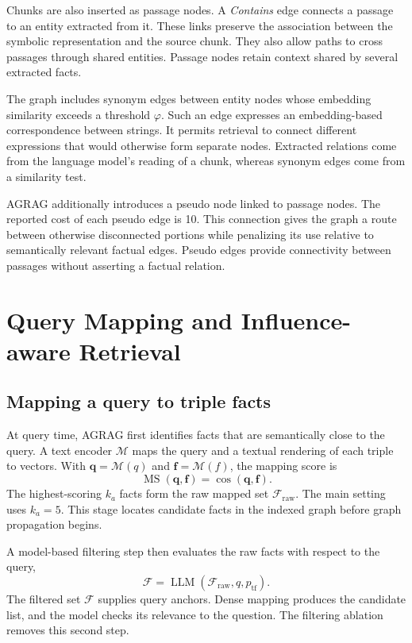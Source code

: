 Chunks are also inserted as passage nodes. A \textit{Contains} edge connects a passage to an entity extracted from it. These links preserve the association between the symbolic representation and the source chunk. They also allow paths to cross passages through shared entities. Passage nodes retain context shared by several extracted facts.

The graph includes synonym edges between entity nodes whose embedding similarity exceeds a threshold $\varphi$. Such an edge expresses an embedding-based correspondence between strings. It permits retrieval to connect different expressions that would otherwise form separate nodes. Extracted relations come from the language model's reading of a chunk, whereas synonym edges come from a similarity test.

AGRAG additionally introduces a pseudo node linked to passage nodes. The reported cost of each pseudo edge is 10. This connection gives the graph a route between otherwise disconnected portions while penalizing its use relative to semantically relevant factual edges. Pseudo edges provide connectivity between passages without asserting a factual relation.

\section{Query Mapping and Influence-aware Retrieval}
\label{sec:agrag:influence}
\subsection{Mapping a query to triple facts}
At query time, AGRAG first identifies facts that are semantically close to the query. A text encoder $\mathcal{M}$ maps the query and a textual rendering of each triple to vectors. With $\mathbf{q}=\mathcal{M}(q)$ and $\mathbf{f}=\mathcal{M}(f)$, the mapping score is
\begin{equation}
\operatorname{MS}(\mathbf{q},\mathbf{f})=
\cos(\mathbf{q},\mathbf{f}).
\label{eq:agrag:mapping}
\end{equation}
The highest-scoring $k_a$ facts form the raw mapped set $\mathcal{F}_{\mathrm{raw}}$. The main setting uses $k_a=5$. This stage locates candidate facts in the indexed graph before graph propagation begins.

A model-based filtering step then evaluates the raw facts with respect to the query,
\begin{equation}
\mathcal{F}=\operatorname{LLM}(\mathcal{F}_{\mathrm{raw}},q,p_{\mathrm{tf}}).
\label{eq:agrag:filter}
\end{equation}
The filtered set $\mathcal{F}$ supplies query anchors. Dense mapping produces the candidate list, and the model checks its relevance to the question. The filtering ablation removes this second step.

